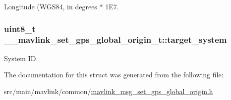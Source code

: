 Longitude (W\+G\+S84, in degrees $\ast$ 1\+E7. 

\hypertarget{struct____mavlink__set__gps__global__origin__t_a8b0950dbed98f3f0515bb5726bc5184c}{
\subsubsection[{target\+\_\+system}]{\setlength{\rightskip}{0pt plus 5cm}uint8\+\_\+t \+\_\+\+\_\+mavlink\+\_\+set\+\_\+gps\+\_\+global\+\_\+origin\+\_\+t\+::target\+\_\+system}}\label{struct____mavlink__set__gps__global__origin__t_a8b0950dbed98f3f0515bb5726bc5184c}


System I\+D. 



The documentation for this struct was generated from the following file\+:\begin{DoxyCompactItemize}
\item 
src/main/mavlink/common/\hyperlink{mavlink__msg__set__gps__global__origin_8h}{mavlink\+\_\+msg\+\_\+set\+\_\+gps\+\_\+global\+\_\+origin.\+h}\end{DoxyCompactItemize}
